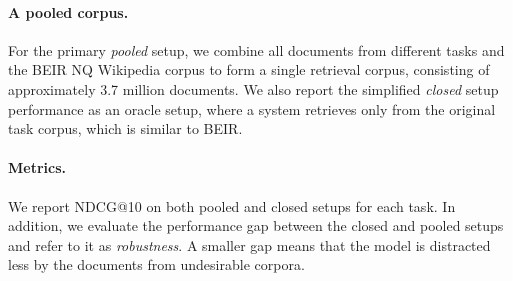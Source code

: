 \paragraph{A pooled corpus.}
For the primary \emph{pooled} setup, we combine all documents from different tasks and the BEIR NQ Wikipedia corpus to form a single retrieval corpus, consisting of approximately 3.7 million documents. 
We also report the simplified \emph{closed} setup performance as an oracle setup, where a system retrieves only from the original task corpus, which is similar to BEIR. 

\paragraph{{Metrics}.}
We report NDCG@10 on both pooled and closed setups for each task. In addition, we evaluate the performance gap between the closed and pooled setups and refer to it as \emph{robustness}.
A smaller gap means that the model is distracted less by the documents from undesirable corpora.


